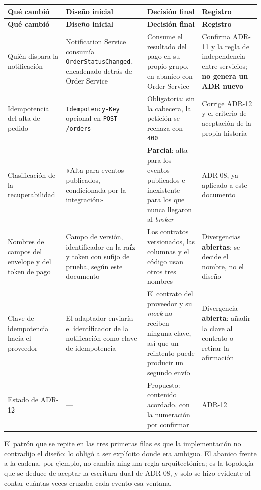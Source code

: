 \documentclass[12pt,a4paper]{article}
\begin{document}
\scriptsize
\setlength{\tabcolsep}{3pt}
\begin{longtable}{P{0.16\textwidth} P{0.22\textwidth} P{0.26\textwidth} P{0.19\textwidth}}
\toprule
\textbf{Qué cambió} & \textbf{Diseño inicial} & \textbf{Decisión final} & \textbf{Registro} \\
\midrule
\endfirsthead
\toprule
\textbf{Qué cambió} & \textbf{Diseño inicial} & \textbf{Decisión final} & \textbf{Registro} \\
\midrule
\endhead
Quién dispara la notificación & Notification Service consumía \texttt{OrderStatusChanged}, encadenado detrás de Order Service & Consume el resultado del pago en su propio grupo, en abanico con Order Service & Confirma ADR-11 y la regla de independencia entre servicios; \textbf{no genera un ADR nuevo} \\
Idempotencia del alta de pedido & \texttt{Idempotency-Key} opcional en \texttt{POST /orders} & Obligatoria: sin la cabecera, la petición se rechaza con \texttt{400} & Corrige ADR-12 y el criterio de aceptación de la propia historia \\
Clasificación de la recuperabilidad & «Alta para eventos publicados, condicionada por la integración» & \textbf{Parcial}: alta para los eventos publicados e inexistente para los que nunca llegaron al \textit{broker} & ADR-08, ya aplicado a este documento \\
Nombres de campos del envelope y del token de pago & Campo de versión, identificador en la raíz y token con sufijo de prueba, según este documento & Los contratos versionados, las columnas y el código usan otros tres nombres & Divergencias \textbf{abiertas}: se decide el nombre, no el diseño \\
Clave de idempotencia hacia el proveedor & El adaptador enviaría el identificador de la notificación como clave de idempotencia & El contrato del proveedor y su \textit{mock} no reciben ninguna clave, así que un reintento puede producir un segundo envío & Divergencia \textbf{abierta}: añadir la clave al contrato o retirar la afirmación \\
Estado de ADR-12 & --- & Propuesto: contenido acordado, con la numeración por confirmar & ADR-12 \\
\bottomrule
\end{longtable}
\setlength{\tabcolsep}{6pt}
\normalsize

El patrón que se repite en las tres primeras filas es que la implementación no contradijo el diseño: lo obligó a ser explícito donde era ambiguo. El abanico frente a la cadena, por ejemplo, no cambia ninguna regla arquitectónica; es la topología que se deduce de aceptar la escritura dual de ADR-08, y solo se hizo evidente al contar cuántas veces cruzaba cada evento esa ventana.
\end{document}
